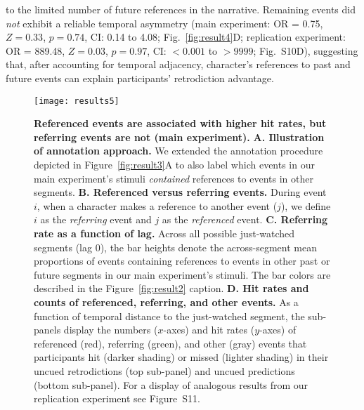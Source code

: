 \documentclass[10pt]{article}
\newcommand{\refAdjacentCorrected}{S10}
\newcommand{\referringReferenced}{S11}
\begin{document}
to the limited number of future references in the narrative. Remaining events did \textit{not} exhibit a reliable temporal asymmetry (main experiment: OR = 0.75, $Z = 0.33$, $p = 0.74$, CI: 0.14 to 4.08; Fig.~\ref{fig:result4}D; replication experiment: OR = 889.48, $Z = 0.03$, $p = 0.97$, CI: $<0.001$ to $>9999$; Fig.~\refAdjacentCorrected D), suggesting that, after accounting for temporal adjacency, character's references to past and future events can explain participants' retrodiction advantage.

\begin{figure}[tp]
  \centering
  \texttt{[image: results5]}

  \caption{\textbf{Referenced events are associated with higher hit rates, but referring events are not (main experiment).} \textbf{A. Illustration of annotation approach.} We extended the annotation procedure depicted in Figure~\ref{fig:result3}A to also label which events in our main experiment's stimuli \textit{contained} references to events in other segments. \textbf{B. Referenced versus referring events.} During event $i$, when a character makes a reference to another event ($j$), we define $i$ as the \textit{referring} event and $j$ as the \textit{referenced} event. \textbf{C. Referring rate as a function of lag.} Across all possible just-watched segments (lag 0), the bar heights denote the across-segment mean proportions of events containing references to events in other past or future segments in our main experiment's stimuli. The bar colors are described in the Figure~\ref{fig:result2} caption. \textbf{D. Hit rates and counts of referenced, referring, and other events.} As a function of temporal distance to the just-watched segment, the sub-panels display the numbers ($x$-axes) and hit rates ($y$-axes) of referenced (red), referring (green), and other (gray) events that participants hit (darker shading) or missed (lighter shading) in their uncued retrodictions (top sub-panel) and uncued predictions (bottom sub-panel). For a display of analogous results from our replication experiment see Figure~\referringReferenced.}

  \label{fig:result5}
\end{figure}
\end{document}

